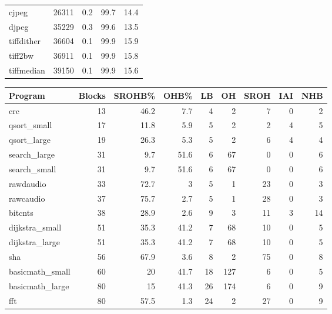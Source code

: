 \begin{tabular}{lrrrr}
 cjpeg           &   26311 &    0.2 &         99.7 &    14.4 \\
 djpeg           &   35229 &    0.3 &         99.6 &    13.5 \\
 tiffdither      &   36604 &    0.1 &         99.9 &    15.9 \\
 tiff2bw         &   36911 &    0.1 &         99.9 &    15.8 \\
 tiffmedian      &   39150 &    0.1 &         99.9 &    15.6 \\
\hline
\end{tabular}\begin{tabular}{lrrrrrrrr}
\hline
 Program         &   Blocks &   SROHB\% &   OHB\% &   LB &   OH &   SROH &   IAI &   NHB \\
\hline
 crc             &       13 &     46.2 &    7.7 &    4 &    2 &      7 &     0 &     2 \\
 qsort\_small     &       17 &     11.8 &    5.9 &    5 &    2 &      2 &     4 &     5 \\
 qsort\_large     &       19 &     26.3 &    5.3 &    5 &    2 &      6 &     4 &     4 \\
 search\_large    &       31 &      9.7 &   51.6 &    6 &   67 &      0 &     0 &     6 \\
 search\_small    &       31 &      9.7 &   51.6 &    6 &   67 &      0 &     0 &     6 \\
 rawdaudio       &       33 &     72.7 &    3   &    5 &    1 &     23 &     0 &     3 \\
 rawcaudio       &       37 &     75.7 &    2.7 &    5 &    1 &     28 &     0 &     3 \\
 bitcnts         &       38 &     28.9 &    2.6 &    9 &    3 &     11 &     3 &    14 \\
 dijkstra\_small  &       51 &     35.3 &   41.2 &    7 &   68 &     10 &     0 &     5 \\
 dijkstra\_large  &       51 &     35.3 &   41.2 &    7 &   68 &     10 &     0 &     5 \\
 sha             &       56 &     67.9 &    3.6 &    8 &    2 &     75 &     0 &     8 \\
 basicmath\_small &       60 &     20   &   41.7 &   18 &  127 &      6 &     0 &     5 \\
 basicmath\_large &       80 &     15   &   41.3 &   26 &  174 &      6 &     0 &     9 \\
 fft             &       80 &     57.5 &    1.3 &   24 &    2 &     27 &     0 &     9 \\

\end{tabular}
